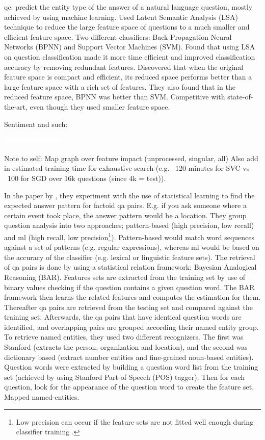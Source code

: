 \gls{qc}: predict the entity type of the answer of a natural language question, mostly achieved by using machine learning. 
Used Latent Semantic Analysis (LSA) technique to reduce the large feature space of questions to a much smaller and efficient feature space. 
Two different classifiers: Back-Propagation Neural Networks (BPNN) and Support Vector Machines (SVM). 
Found that using LSA on question classification made it more time efficient and improved classification accuracy by removing redundant features. 
Discovered that when the original feature space is compact and efficient, its reduced space performs better than a large feature space with a rich set of features. 
They also found that in the reduced feature space, BPNN was better than SVM.  
Competitive with state-of-the-art, even though they used smaller feature space.
\cite{Loni2011}

Sentiment and such: \cite{Maas2011}	

------------------------

Note to self: Map graph over feature impact (unprocessed, singular, all)
Also add in estimated training time for exhaustive search (e.g. ~120 minutes for SVC vs ~100 for SGD over 16k questions (since 4k = test)). 


In the paper by \textcite{Toba2011}, they experiment with the use of statistical learning to find the expected answer pattern for factoid \gls{qa} pairs. 
E.g. if you ask someone where a certain event took place, the answer pattern would be a location. 
They group question analysis into two approaches; pattern-based (high precision, low recall) and \gls{ml} (high recall, 
low precision\footnote{
	Low precision can occur if the feature sets are not fitted well enough during classifier training 
	\cite[p.~283]{Toba2011}.
}). 
Pattern-based would match word sequences against a set of patterns (e.g. regular expressions), whereas \gls{ml} would be based on the accuracy of the classifier 
(e.g. lexical or linguistic feature sets). 
The retrieval of \gls{qa} pairs is done by using a statistical relation framework: Bayesian Analogical Reasoning (BAR). 
Features sets are extracted from the training set by use of binary values checking if the question contains a given question word. 
The BAR framework then learns the related features and computes the estimation for them. 
Thereafter \gls{qa} pairs are retrieved from the testing set and compared against the training set. 
Afterwards, the \gls{qa} pairs that have identical question words are identified, and overlapping pairs are grouped according their named entity group.
To retrieve named entities, they used two different recognizers. 
The first was Stanford (extracts the person, organization and location), and the second was dictionary based (extract number entities and fine-grained noun-based entities). 
Question words were extracted by building a question word list from the training set (achieved by using Stanford Part-of-Speech (POS) tagger). 
Then for each question, look for the appearance of the question word to create the feature set.
Mapped named-entities.
\cite{Toba2011}

